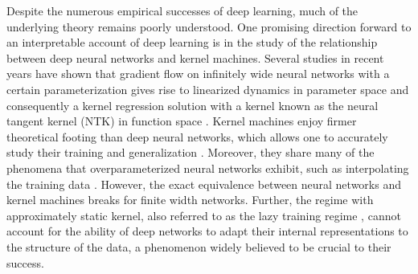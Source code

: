 \documentclass{article} %
\begin{document}
Despite the numerous empirical successes of deep learning, much of the underlying theory remains poorly understood. One promising direction forward to an interpretable account of deep learning is in the study of the relationship between deep neural networks and kernel machines. Several studies in recent years have shown that gradient flow on infinitely wide neural networks with a certain parameterization gives rise to linearized dynamics in parameter space \citep{Lee2019WideNN, liu_belkin} and consequently a kernel regression solution with a kernel known as the neural tangent kernel (NTK) in function space \citep{Jacot2018NeuralTK, Arora2019OnEC}. Kernel machines enjoy firmer theoretical footing than deep neural networks, which allows one to accurately study their training and generalization \citep{RasmussenW06, Scholkopf2002}. Moreover, they share many of the phenomena that overparameterized neural networks exhibit, such as interpolating the training data \citep{zhang_rethinking, liang_rahklin_interpolate, belkin_deep_kernel_understand}. However, the exact equivalence between neural networks and kernel machines breaks for finite width networks. %
Further, the regime with approximately static kernel, also referred to as the lazy training regime \citep{Chizat2019OnLT}, cannot account for the ability of deep networks to adapt their internal representations to the structure of the data, a phenomenon widely believed to be crucial to their success. 

\end{document}
